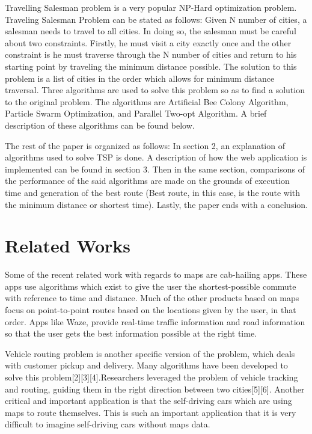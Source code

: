 \documentclass[conference]{IEEEtran}
\begin{document}
Travelling Salesman problem is a very popular NP-Hard optimization problem. Traveling Salesman Problem can be stated as follows: Given N number of cities, a salesman needs to travel to all cities. In doing so, the salesman must be careful about two constraints. Firstly, he must visit a city exactly once and the other constraint is he must traverse through the N number of cities and return to his starting point by traveling the minimum distance possible. The solution to this problem is a list of cities in the order which allows for minimum distance traversal. Three algorithms are used to solve this problem so as to find a solution to the original problem. The algorithms are Artificial Bee Colony Algorithm, Particle Swarm Optimization, and Parallel Two-opt Algorithm. A brief description of these algorithms can be found below.
\linebreak
\par
The rest of the paper is organized as follows: In section 2, an explanation of algorithms used to solve TSP is done. A description of how the web application is implemented can be found in section 3. Then in the same section, comparisons of the performance of the said algorithms are made on the grounds of execution time and generation of the best route (Best route, in this case, is the route with the minimum distance or shortest time). Lastly, the paper ends with a conclusion.

\section {Related Works}
Some of the recent related work with regards to maps are cab-hailing apps. These apps use algorithms which exist to give the user the shortest-possible commute with reference to time and distance. Much of the other products based on maps focus on point-to-point routes based on the locations given by the user, in that order. Apps like Waze, provide real-time traffic information and road information so that the user gets the best information possible at the right time.

Vehicle routing problem is another specific version of the problem, which deals with customer pickup and delivery. Many algorithms have been developed to solve this problem[2][3][4].Researchers leveraged the problem of vehicle tracking and routing, guiding them in the right direction between two cities[5][6]. Another critical and important application is that the self-driving cars which are using maps to route themselves. This is such an important application that it is very difficult to imagine self-driving cars without maps data.
\end{document}

